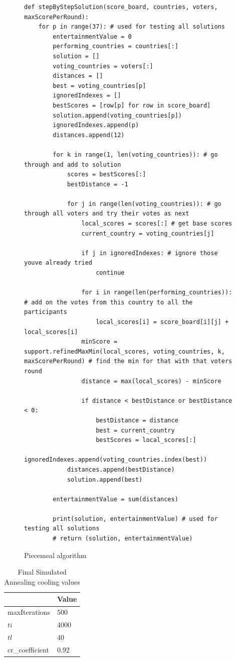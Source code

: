 \documentclass[12pt]{report}
\begin{document}
\begin{figure}[H]
\caption{Piecemeal algorithm}
\label{piecemealCode}
\begin{lstlisting}
def stepByStepSolution(score_board, countries, voters, maxScorePerRound):
    for p in range(37): # used for testing all solutions
        entertainmentValue = 0
        performing_countries = countries[:]
        solution = []
        voting_countries = voters[:]
        distances = []
        best = voting_countries[p]
        ignoredIndexes = []
        bestScores = [row[p] for row in score_board]
        solution.append(voting_countries[p])
        ignoredIndexes.append(p)
        distances.append(12)

        for k in range(1, len(voting_countries)): # go through and add to solution
            scores = bestScores[:]
            bestDistance = -1
            
            for j in range(len(voting_countries)): # go through all voters and try their votes as next
                local_scores = scores[:] # get base scores
                current_country = voting_countries[j]
                
                if j in ignoredIndexes: # ignore those youve already tried
                    continue

                for i in range(len(performing_countries)): # add on the votes from this country to all the participants
                    local_scores[i] = score_board[i][j] + local_scores[i]
                minScore = support.refinedMaxMin(local_scores, voting_countries, k, maxScorePerRound) # find the min for that with that voters round
                distance = max(local_scores) - minScore
                
                if distance < bestDistance or bestDistance < 0:
                    bestDistance = distance
                    best = current_country
                    bestScores = local_scores[:]
            ignoredIndexes.append(voting_countries.index(best))
            distances.append(bestDistance)
            solution.append(best)
        
        entertainmentValue = sum(distances)

        print(solution, entertainmentValue) # used for testing all solutions
        # return (solution, entertainmentValue)
\end{lstlisting}
\end{figure}

\begin{table}[H]
\centering
\caption{Final Simulated Annealing cooling values}
\label{coolingValues}
\begin{tabular}{|l|l|}
\hline
                  & Value \\ \hline
maxIterations              & 500  \\ \hline
$ti$              & 4000  \\ \hline
$tl$              & 40    \\ \hline
cr\_coefficient & 0.92  \\ \hline
\end{tabular}
\end{table}
\end{document}
